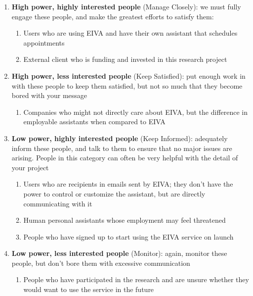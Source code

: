 \documentclass{article}
\begin{document}
\begin{enumerate}
 \item \textbf{High power, highly interested people} (Manage Closely): we must fully engage these people, and make the greatest efforts to satisfy them:
  \begin{enumerate}
    \item Users who are using EIVA and have their own assistant that schedules appointments
    \item External client who is funding and invested in this research project
  \end{enumerate}
 \item \textbf{High power, less interested people} (Keep Satisfied): put enough work in with these people to keep them satisfied, but not so much that they become bored with your message
  \begin{enumerate}
    \item Companies who might not directly care about EIVA, but the difference in employable assistants when compared to EIVA
  \end{enumerate}
 \item \textbf{Low power, highly interested people} (Keep Informed): adequately inform these people, and talk to them to ensure that no major issues are arising. People in this category can often be very helpful with the detail of your project
  \begin{enumerate}
    \item Users who are recipients in emails sent by EIVA; they don't have the power to control or customize the assistant, but are directly communicating with it
    \item Human personal assistants whose employment may feel threatened
    \item People who have signed up to start using the EIVA service on launch
  \end{enumerate}
 \item \textbf{Low power, less interested people} (Monitor): again, monitor these people, but don’t bore them with excessive communication
  \begin{enumerate}
    \item People who have participated in the research and are unsure whether they would want to use the service in the future
  \end{enumerate}
\end{enumerate}
\end{document}
